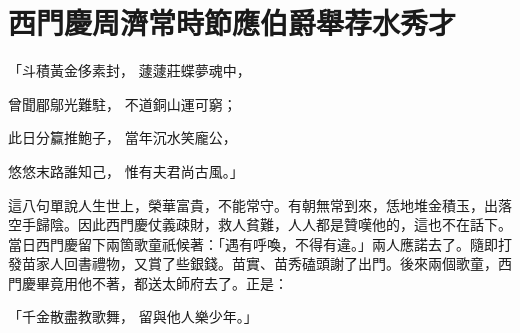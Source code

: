 %

\chapter{西門慶周濟常時節\KG 應伯爵舉荐水秀才}


\begin{showcontents}{}



「斗積黃金侈素封，  蘧蘧莊蝶夢魂中，

曾聞郿鄔光難駐，  不道銅山運可窮；

此日分籯推鮑子，  當年沉水笑龐公，

悠悠末路誰知己，  惟有夫君尚古風。」

這八句單說人生世上，榮華富貴，不能常守。有朝無常到來，恁地堆金積玉，出落空手歸陰。因此西門慶仗義疎財，救人貧難，人人都是贊嘆他的，這也不在話下。當日西門慶留下兩箇歌童祇候著：「遇有呼喚，不得有違。」兩人應諾去了。隨即打發苗家人回書禮物，又賞了些銀錢。苗實、苗秀磕頭謝了出門。後來兩個歌童，西門慶畢竟用他不著，都送太師府去了。正是：

「千金散盡教歌舞，  留與他人樂少年。」


\end{showcontents}
